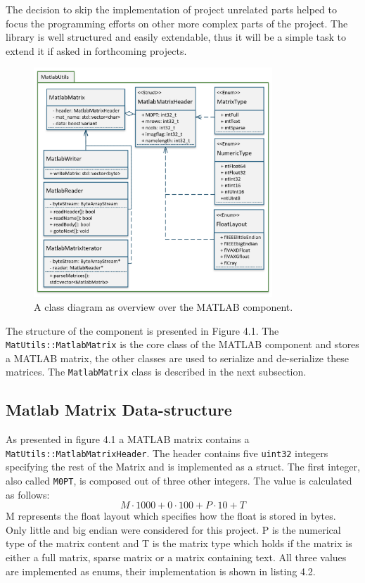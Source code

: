 The decision to skip the implementation of project unrelated parts helped to focus the programming efforts on other more complex parts of the project. The library is well structured and easily extendable, thus it will be a simple task to extend it if asked in forthcoming projects.
\begin{figure}[h]
\centering
      \includegraphics[width=0.8\textwidth]{mlab}
        \caption{A class diagram as overview over the MATLAB component.}
\end{figure}
The structure of the component is presented in Figure 4.1. The \texttt{MatUtils::MatlabMatrix} is the core class of the MATLAB component and stores a MATLAB matrix, the other classes are used to serialize and de-serialize these matrices. The \texttt{MatlabMatrix} class is described in the next subsection.
\subsection{Matlab Matrix Data-structure}
As presented in figure 4.1 a MATLAB matrix contains a \texttt{MatUtils::MatlabMatrixHeader}. The header contains five \texttt{uint32} integers specifying the rest of the Matrix and is implemented as a struct. The first integer, also called \texttt{M0PT}, is composed out of three other integers. The value is calculated as follows:
$$M\cdot1000 + 0 \cdot 100 + P\cdot 10 + T$$
M represents the float layout which specifies how the float is stored in bytes. Only little and big endian were considered for this project. P is the numerical type of the matrix content and T is the matrix type which holds if the matrix is either a full matrix, sparse matrix or a matrix containing text. All three values are implemented as enums, their implementation is shown in listing 4.2.

